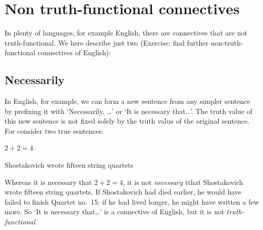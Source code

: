 



\section{Non truth-functional connectives}
In plenty of languages, for example English, there are connectives that are not truth-functional. We here describe just two (Exercise: find further non-truth-functional connectives of English):

\subsection{Necessarily}

In English, for example, we can form a new sentence from any simpler sentence by prefixing it with `Necessarily, \ldots' or  `It is necessary that\ldots'. The truth value of this new sentence is not fixed solely by the truth value of the original sentence. For consider two true sentences:
\begin{samplesent}
	\item\label{sent:nec-math} $2 + 2 = 4$
	\item\label{sent:nec-music} Shostakovich wrote fifteen string quartets
\end{samplesent}
Whereas it is necessary that $2 + 2 = 4$, it is not \emph{necessary} tthat Shostakovich wrote fifteen string quartets. If Shostakovich had died earlier, he would have failed to finish Quartet no.\ 15; if he had lived longer, he might have written a few more. So `It is necessary that\ldots' is a connective of English, but it is not \emph{truth-functional}.




